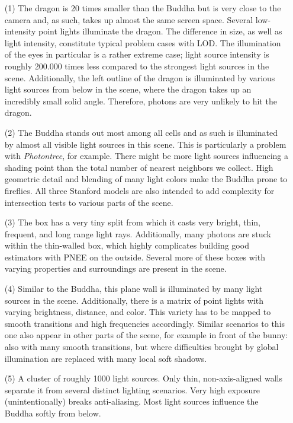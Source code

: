 \begin{itemize}
    \item[(1)] The dragon is 20 times smaller than the Buddha but is very close to the camera and, as such, takes up almost the same screen space. Several low-intensity point lights illuminate the dragon. The difference in size, as well as light intensity, constitute typical problem cases with LOD. The illumination of the eyes in particular is a rather extreme case; light source intensity is roughly 200.000 times less compared to the strongest light sources in the scene. Additionally, the left outline of the dragon is illuminated by various light sources from below in the scene, where the dragon takes up an incredibly small solid angle. Therefore, photons are very unlikely to hit the dragon.
    \item[(2)] The Buddha stands out most among all cells and as such is illuminated by almost all visible light sources in this scene. This is particularly a problem with \textit{Photontree}, for example. There might be more light sources influencing a shading point than the total number of nearest neighbors we collect. High geometric detail and blending of many light colors make the Buddha prone to fireflies.  All three Stanford models are also intended to add complexity for intersection tests to various parts of the scene. 
    \item[(3)] The box has a very tiny split from which it casts very bright, thin, frequent, and long range light rays. Additionally, many photons are stuck within the thin-walled box, which highly complicates building good estimators with PNEE on the outside. Several more of these boxes with varying properties and surroundings are present in the scene. 
    \item[(4)] Similar to the Buddha, this plane wall is illuminated by many light sources in the scene. Additionally, there is a matrix of point lights with varying brightness, distance, and color. This variety has to be mapped to smooth transitions and high frequencies accordingly. Similar scenarios to this one also appear in other parts of the scene, for example in front of the bunny: also with many smooth transitions, but where difficulties brought by global illumination are replaced with many local soft shadows. 
    \item[(5)] A cluster of roughly 1000 light sources. Only thin, non-axis-aligned walls separate it from several distinct lighting scenarios. Very high exposure (unintentionally) breaks anti-aliasing. Most light sources influence the Buddha softly from below. 

\end{itemize}
